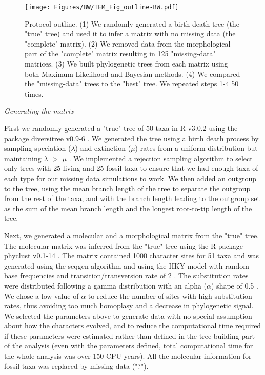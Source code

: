 \documentclass[12pt,letterpaper]{article}
\renewcommand{\subsection}[1]{%
\bigskip
\begin{center}
\begin{large}
\normalfont\itshape #1
\end{large}
\end{center}}
\begin{document}
\begin{figure}
\centering
    \texttt{[image: Figures/BW/TEM\_Fig\_outline-BW.pdf]}
\caption{Protocol outline.
(1) We randomly generated a birth-death tree (the "true" tree) and used it to infer a matrix with no missing data (the "complete" matrix).
(2) We removed data from the morphological part of the "complete" matrix resulting in 125 "missing-data" matrices.
(3) We built phylogenetic trees from each matrix using both Maximum Likelihood and Bayesian methods.
(4) We compared the "missing-data" trees to the "best" tree.
We repeated steps 1-4 50 times.}
\label{Fig_Outline}
\end{figure}


\subsection{Generating the matrix}
First we randomly generated a "true" tree of 50 taxa in R v3.0.2 \citep{R302} using the package diversitree v0.9-6 \citep{fitzjohndiversitree2012}. We generated the tree using a birth death process by sampling speciation ($\lambda$) and extinction ($\mu$) rates from a uniform distribution but maintaining $\lambda$ $>$ $\mu$ \citep{paradistime-dependent2011}. We implemented a rejection sampling algorithm to select only trees with 25 living and 25 fossil taxa to ensure that we had enough taxa of each type for our missing data simulations to work. We then added an outgroup to the tree, using the mean branch length of the tree to separate the outgroup from the rest of the taxa, and with the branch length leading to the outgroup set as the sum of the mean branch length and the longest root-to-tip length of the tree.

Next, we generated a molecular and a morphological matrix from the "true" tree. The molecular matrix was inferred from the "true" tree using the R package phyclust v0.1-14 \citep{chen2011}. The matrix contained 1000 character sites for 51 taxa and was generated using the seqgen algorithm \citep{ranbaut1997seqgen} and using the HKY model \citep{HKY85} with random base frequencies and transition/transversion rate of 2 \citep{douadycomparison2003}. The substitution rates were distributed following a gamma distribution with an alpha ($\alpha$) shape of 0.5 \citep{yangamong-site1996}. We chose a low value of $\alpha$ to reduce the number of sites with high substitution rates, thus avoiding too much homoplasy and a decrease in phylogenetic signal. We selected the parameters above to generate data with no special assumption about how the characters evolved, and to reduce the computational time required if these parameters were estimated rather than defined in the tree building part of the analysis (even with the parameters defined, total computational time for the whole analysis was over 150 CPU years). All the molecular information for fossil taxa was replaced by missing data ("?").
\end{document}
